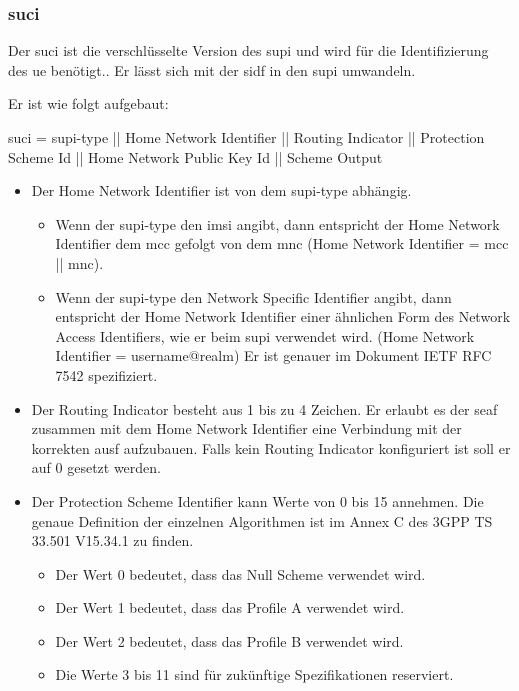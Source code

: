 \subsubsection{\gls{suci}}
Der \gls{suci} ist die verschlüsselte Version des \gls{supi} und wird für die Identifizierung des \gls{ue} benötigt..
Er lässt sich mit der \gls{sidf} in den \gls{supi} umwandeln.

Er ist wie folgt aufgebaut: %

\gls{suci} = \gls{supi-type} || Home Network Identifier || Routing Indicator || Protection Scheme Id || Home Network Public Key Id || Scheme Output

\begin{itemize}
\item Der Home Network Identifier ist von dem \gls{supi-type} abhängig.
\begin{itemize}
\item Wenn der \gls{supi-type} den \gls{imsi} angibt, dann entspricht der Home Network Identifier dem \gls{mcc} gefolgt von dem \gls{mnc} (Home Network Identifier = \gls{mcc} || \gls{mnc}). 
\item Wenn der \gls{supi-type} den Network Specific Identifier angibt, dann entspricht der Home Network Identifier einer ähnlichen Form des Network Access Identifiers, wie er beim \gls{supi} verwendet wird. (Home Network Identifier = username@realm)
Er ist genauer im Dokument IETF RFC 7542 spezifiziert. %
\end{itemize}
\item Der Routing Indicator besteht aus 1 bis zu 4 Zeichen. %
Er erlaubt es der \gls{seaf} zusammen mit dem Home Network Identifier eine Verbindung mit der korrekten \gls{ausf} aufzubauen.
Falls kein Routing Indicator konfiguriert ist soll er auf 0 gesetzt werden.
\item Der Protection Scheme Identifier kann Werte von 0 bis 15 annehmen.
Die genaue Definition der einzelnen Algorithmen ist im Annex C des 3GPP TS 33.501 V15.34.1 zu finden. %
\begin{itemize}
\item Der Wert 0 bedeutet, dass das Null Scheme verwendet wird.
\item Der Wert 1 bedeutet, dass das Profile A verwendet wird.
\item Der Wert 2 bedeutet, dass das Profile B verwendet wird.
\item Die Werte 3 bis 11 sind für zukünftige Spezifikationen reserviert.

\end{itemize}
\end{itemize}
